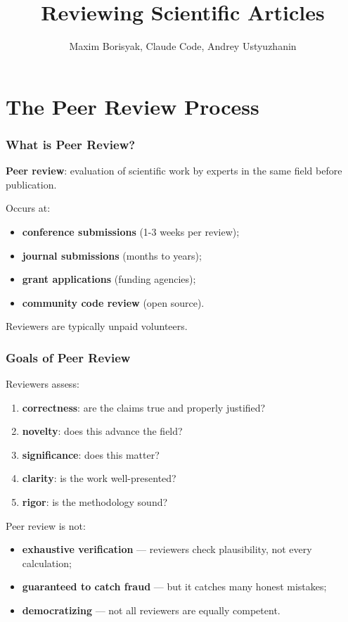 \documentclass[]{beamer}
\author{Maxim Borisyak, Claude Code, Andrey Ustyuzhanin}
\institute{Constructor University Bremen}
\begin{document}
\title{Reviewing Scientific Articles}

\begin{frame}[plain]
\titlepage
\end{frame}

\section{The Peer Review Process}

\begin{frame}[fragile]
\frametitle{What is Peer Review?}
\textbf{Peer review}: evaluation of scientific work by experts in the same field before publication.

Occurs at:
\begin{itemize}
  \item \textbf{conference submissions} (1-3 weeks per review);
  \item \textbf{journal submissions} (months to years);
  \item \textbf{grant applications} (funding agencies);
  \item \textbf{community code review} (open source).
\end{itemize}

Reviewers are typically unpaid volunteers.

\end{frame}

\begin{frame}[fragile]
\frametitle{Goals of Peer Review}
Reviewers assess:
\begin{enumerate}
  \item \textbf{correctness}: are the claims true and properly justified?
  \item \textbf{novelty}: does this advance the field?
  \item \textbf{significance}: does this matter?
  \item \textbf{clarity}: is the work well-presented?
  \item \textbf{rigor}: is the methodology sound?
\end{enumerate}

Peer review is not:
\begin{itemize}
  \item \textbf{exhaustive verification} — reviewers check plausibility, not every calculation;
  \item \textbf{guaranteed to catch fraud} — but it catches many honest mistakes;
  \item \textbf{democratizing} — not all reviewers are equally competent.
\end{itemize}

\end{frame}
\end{document}
